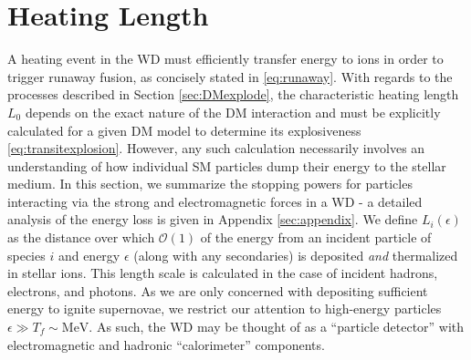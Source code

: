 \documentclass[twocolumn,showpacs,preprintnumbers,amsmath,amssymb,prd]{revtex4}
\newcommand{\OO}{\mathcal{O}}
\begin{document}
\section{Heating Length}
\label{sec:HeatingLength}
A heating event in the WD must efficiently transfer energy to ions in order to trigger runaway fusion, as concisely stated in \eqref{eq:runaway}. With regards to the processes described in Section \ref{sec:DMexplode}, the characteristic heating length $L_0$ depends on the exact nature of the DM interaction and must be explicitly calculated for a given DM model to determine its explosiveness \eqref{eq:transitexplosion}. However, any such calculation necessarily involves an understanding of how individual SM particles dump their energy to the stellar medium. In this section, we summarize the stopping powers for particles interacting via the strong and electromagnetic forces in a WD - a detailed analysis of the energy loss is given in Appendix \ref{sec:appendix}. We define $L_i(\epsilon)$ as the distance over which $\OO(1)$ of the energy from an incident particle of species $i$ and energy $\epsilon$ (along with any secondaries) is deposited \emph{and} thermalized in stellar ions. This length scale is calculated in the case of incident hadrons, electrons, and photons. As we are only concerned with depositing sufficient energy to ignite supernovae, we restrict our attention to high-energy particles $\epsilon \gg T_f \sim \text{MeV}$. As such, the WD may be thought of as a ``particle detector'' with electromagnetic and hadronic ``calorimeter'' components.
\end{document}
